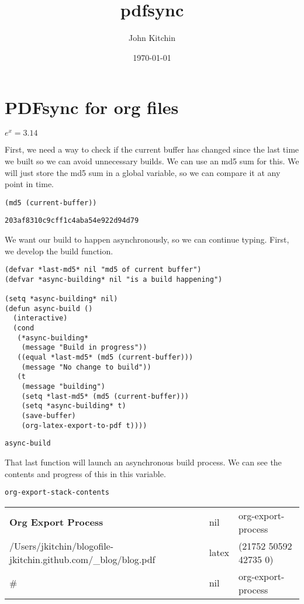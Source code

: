 \documentclass{article}
\author{John Kitchin}
\date{\today}
\title{pdfsync}
\begin{document}
\tableofcontents

\section{PDFsync for org files}
\label{sec-1}


\(e^x = 3.14\)

First, we need a way to check if the current buffer has changed since the last time we built so we can avoid unnecessary builds. We can use an md5 sum for this. We will just store the md5 sum in a global variable, so we can compare it at any point in time.

\begin{verbatim}
(md5 (current-buffer))
\end{verbatim}

\begin{verbatim}
203af8310c9cff1c4aba54e922d94d79
\end{verbatim}

We want our build to happen asynchronously, so we can continue typing. First, we develop the build function.

\begin{verbatim}
(defvar *last-md5* nil "md5 of current buffer")
(defvar *async-building* nil "is a build happening")

(setq *async-building* nil)
(defun async-build ()
  (interactive)
  (cond
   (*async-building*
    (message "Build in progress"))
   ((equal *last-md5* (md5 (current-buffer)))
    (message "No change to build"))
   (t
    (message "building")
    (setq *last-md5* (md5 (current-buffer)))
    (setq *async-building* t)
    (save-buffer)
    (org-latex-export-to-pdf t))))
\end{verbatim}
\begin{verbatim}
async-build
\end{verbatim}

That last function will launch an asynchronous build process. We can see the contents and progress of this in this variable.

\begin{verbatim}
org-export-stack-contents
\end{verbatim}
\begin{center}
\begin{tabular}{lll}
\textbf{Org Export Process} & nil & org-export-process\\
/Users/jkitchin/blogofile-jkitchin.github.com/\_blog/blog.pdf & latex & (21752 50592 42735 0)\\
\#<killed buffer> & nil & org-export-process\\
\end{tabular}
\end{center}
\end{document}
